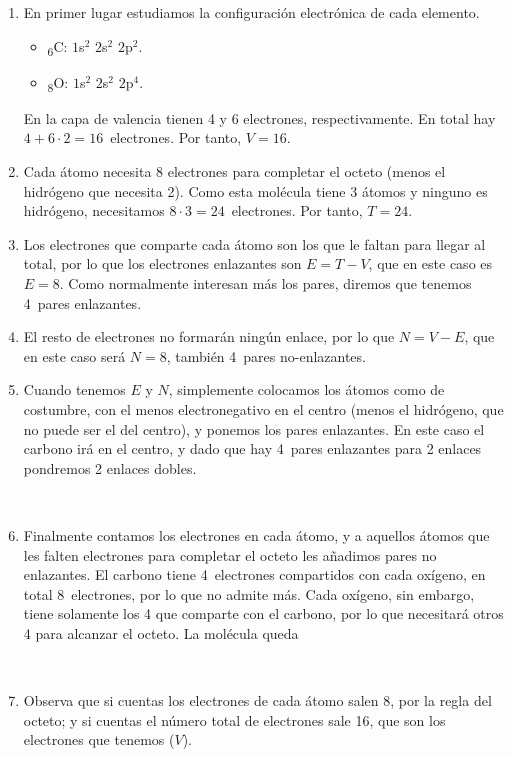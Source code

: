 \documentclass[twoside,a4paper,justified,12pt]{tufte-handout}
\renewcommand{\sb}[1]{\textsubscript{#1}}
\begin{document}
\begin{enumerate}[1)]
    \item En primer lugar estudiamos la configuración electrónica de cada elemento.
    \begin{itemize}
        \item \sb{6}C: $1$s$^2$ $2$s$^2$ $2$p$^2$.
        \item \sb{8}O: $1$s$^2$ $2$s$^2$ $2$p$^4$.
    \end{itemize}
    
    En la capa de valencia tienen 4 y 6 electrones, respectivamente. En total hay $4+6\cdot2=16$~electrones. Por tanto, $V=16$.
    
    \item Cada átomo necesita 8 electrones para completar el octeto (menos el hidrógeno que necesita 2). Como esta molécula tiene 3 átomos y ninguno es hidrógeno, necesitamos $8\cdot 3=24$~electrones. Por tanto, $T=24$.
    
    \item Los electrones que comparte cada átomo son los que le faltan para llegar al total, por lo que los electrones enlazantes son $E=T-V$, que en este caso es $E=8$. Como normalmente interesan más los pares, diremos que tenemos 4~pares enlazantes.
    
    \item El resto de electrones no formarán ningún enlace, por lo que $N=V-E$, que en este caso será $N=8$, también 4~pares no-enlazantes.
    
    \item Cuando tenemos $E$ y $N$, simplemente colocamos los átomos como de costumbre, con el menos electronegativo en el centro (menos el hidrógeno, que no puede ser el del centro), y ponemos los pares enlazantes. En este caso el carbono irá en el centro, y dado que hay 4~pares enlazantes para 2 enlaces pondremos 2 enlaces dobles.
    
     {\centering{}\\}
     
    \item Finalmente contamos los electrones en cada átomo, y a aquellos átomos que les falten electrones para completar el octeto les añadimos pares no enlazantes. El carbono tiene 4~electrones compartidos con cada oxígeno, en total 8~electrones, por lo que no admite más. Cada oxígeno, sin embargo, tiene solamente los 4 que comparte con el carbono, por lo que necesitará otros 4 para alcanzar el octeto. La molécula queda
    
      {\centering{}\\}
      
    \item Observa que si cuentas los electrones de cada átomo salen 8, por la regla del octeto; y si cuentas el número total de electrones sale 16, que son los electrones que tenemos ($V$).
    
\end{enumerate}
\end{document}
